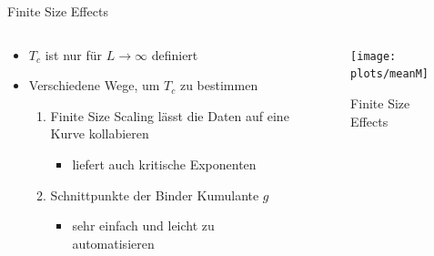 \documentclass{beamer}
\begin{document}
    \begin{frame}{Finite Size Effects}
        \begin{columns}[t]
            \begin{column}{5cm}
                \begin{itemize}[<+->]
                    \item \(T_{c}\) ist nur für \(L \to \infty\) definiert
                    \item Verschiedene Wege, um \(T_{c}\) zu bestimmen
                    \begin{enumerate}[<+->]
                        \item Finite Size Scaling lässt die Daten auf eine Kurve kollabieren
                        \begin{itemize}[<+->]
                            \item liefert auch kritische Exponenten
                        \end{itemize}
                        \item Schnittpunkte der Binder Kumulante \(g\)
                        \begin{itemize}[<+->]
                            \item sehr einfach und leicht zu automatisieren
                        \end{itemize}
                    \end{enumerate}
                \end{itemize}
            \end{column}
            \begin{column}{6cm}
                \begin{figure}[htbp]
                    \centering
                    \texttt{[image: plots/meanM]}
                    \caption
                    {
                        Finite Size Effects
                    }
                \end{figure}
            \end{column}
        \end{columns}
    \end{frame}
\end{document}
